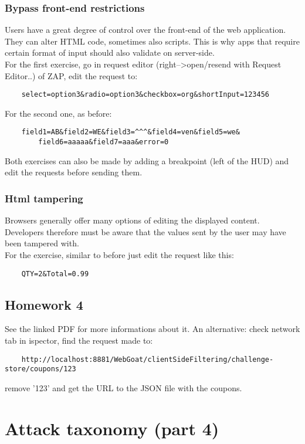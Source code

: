 \documentclass[a4paper, 10pt, titlepage]{article}
\begin{document}
\subsubsection*{Bypass front-end restrictions}
Users have a great degree of control over the front-end of the web application. They can alter HTML code, sometimes also scripts. This is why apps that require certain format of input should also validate on server-side. \\
For the first exercise, go in request editor (right-->open/resend with Request Editor..) of ZAP, edit the request to:
\begin{lstlisting}
	select=option3&radio=option3&checkbox=org&shortInput=123456
\end{lstlisting}
For the second one, as before:
\begin{lstlisting}
	field1=AB&field2=WE&field3=^^^&field4=ven&field5=we&
		field6=aaaaa&field7=aaa&error=0
\end{lstlisting}
Both exercises can also be made by adding a breakpoint (left of the HUD) and edit the requests before sending them.

\subsubsection*{Html tampering}
Browsers generally offer many options of editing the displayed content. Developers therefore must be aware that the values sent by the user may have been tampered with. \\
For the exercise, similar to before just edit the request like this:
\begin{lstlisting}
	QTY=2&Total=0.99
\end{lstlisting}

\subsection{Homework 4}
	See the linked PDF for more informations about it. An alternative: check network tab in ispector, find the request made to:
\begin{verbatim}
	http://localhost:8881/WebGoat/clientSideFiltering/challenge-store/coupons/123
\end{verbatim}	 
remove '123' and get the URL to the JSON file with the coupons.
	
\newpage
\section{Attack taxonomy (part 4)}
\end{document}
